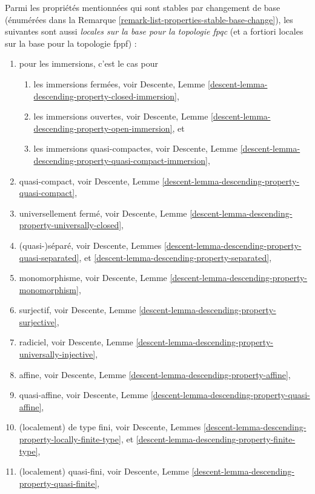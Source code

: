 \begin{remark}
\label{remark-list-properties-fpqc-local-base}
Parmi les propriétés mentionnées qui sont stables par changement de base
(énumérées dans la Remarque \ref{remark-list-properties-stable-base-change}),
les suivantes sont aussi {\it locales sur la base pour la topologie fpqc}
(et a fortiori locales sur la base pour la topologie fppf) :
\begin{enumerate}
\item pour les immersions, c'est le cas pour
\begin{enumerate}
\item les immersions fermées, voir
Descente, Lemme \ref{descent-lemma-descending-property-closed-immersion},
\item les immersions ouvertes, voir
Descente, Lemme \ref{descent-lemma-descending-property-open-immersion}, et
\item les immersions quasi-compactes, voir
Descente,
Lemme \ref{descent-lemma-descending-property-quasi-compact-immersion},
\end{enumerate}
\item quasi-compact, voir
Descente, Lemme \ref{descent-lemma-descending-property-quasi-compact},
\item universellement fermé, voir
Descente, Lemme
\ref{descent-lemma-descending-property-universally-closed},
\item (quasi-)séparé, voir
Descente, Lemmes
\ref{descent-lemma-descending-property-quasi-separated}, et
\ref{descent-lemma-descending-property-separated},
\item monomorphisme, voir
Descente, Lemme \ref{descent-lemma-descending-property-monomorphism},
\item surjectif, voir
Descente, Lemme \ref{descent-lemma-descending-property-surjective},
\item radiciel, voir
Descente, Lemme \ref{descent-lemma-descending-property-universally-injective},
\item affine, voir
Descente, Lemme \ref{descent-lemma-descending-property-affine},
\item quasi-affine, voir
Descente, Lemme \ref{descent-lemma-descending-property-quasi-affine},
\item (localement) de type fini, voir
Descente,
Lemmes \ref{descent-lemma-descending-property-locally-finite-type}, et
\ref{descent-lemma-descending-property-finite-type},
\item (localement) quasi-fini, voir
Descente, Lemme \ref{descent-lemma-descending-property-quasi-finite},

\end{enumerate}
\end{remark}
